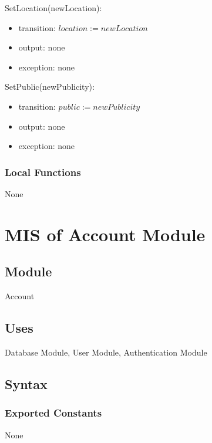\documentclass[12pt, titlepage]{article}
\begin{document}
\noindent SetLocation(newLocation):
\begin{itemize}
\item transition: $location := newLocation$
\item output: none
\item exception: none
\end{itemize}

\noindent SetPublic(newPublicity):
\begin{itemize}
\item transition: $public := newPublicity$
\item output: none
\item exception: none
\end{itemize}
\subsubsection{Local Functions}

None

\newpage

\section{MIS of Account Module} \label{mAccount}

\subsection{Module}

Account

\subsection{Uses}

Database Module, User Module, Authentication Module

\subsection{Syntax}

\subsubsection{Exported Constants}
None
\end{document}
